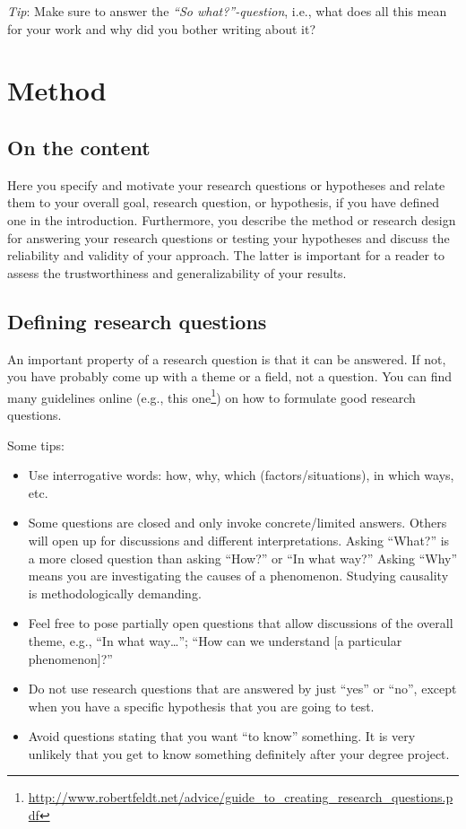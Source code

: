 \documentclass[a4paper,twoside]{bth}
\begin{document}
\emph{Tip}: Make sure to answer the \emph{``So what?''-question}, i.e., what does all this mean for your work and why did you bother writing about it?


\chapter{Method}
\label{chp:method}
\section{On the content}
Here you specify and motivate your research questions or hypotheses and relate them to your overall goal, research question, or hypothesis, if you have defined one in the introduction. Furthermore, you describe the method or research design for answering your research questions or testing your hypotheses and discuss the reliability and validity of your approach. The latter is important for a reader to assess the trustworthiness and generalizability of your results.  


\section{Defining research questions}
An important property of a research question is that it can be answered. If not, you have probably come up with a theme or a field, not a question. You can find many guidelines online (e.g., this one\footnote{\url{http://www.robertfeldt.net/advice/guide_to_creating_research_questions.pdf}}) on how to formulate good research questions.

Some tips:
\begin{itemize}
    \item Use interrogative words: how, why, which (factors/situations), in which ways, etc.
    \item Some questions are closed and only invoke concrete/limited answers. Others will open up for discussions and different interpretations.
    Asking ``What?'' is a more closed question than asking ``How?'' or ``In what way?'' Asking ``Why'' means you are investigating the causes of a phenomenon. Studying causality is methodologically demanding.
    \item Feel free to pose partially open questions that allow discussions of the overall theme, e.g., ``In what way\dots''; ``How can we understand [a particular phenomenon]?''
    \item Do not use research questions that are answered by just ``yes'' or ``no'', except when you have a specific hypothesis that you are going to test.
    \item Avoid questions stating that you want ``to know'' something. It is very unlikely that you get to know something definitely after your degree project.
\end{itemize}
\end{document}
